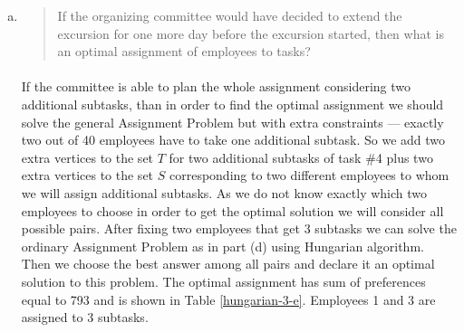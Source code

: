 \begin{enumerate}[(a)]
\item\begin{quote}If the organizing committee would have decided to extend the excursion for one
more day before the excursion started, then what is an optimal assignment of
employees to tasks?\end{quote}

	\paragraph{}
	If the committee is able to plan the whole assignment considering two additional subtasks, than in order to find the optimal assignment we should solve the general Assignment Problem but with extra constraints --- exactly two out of 40 employees have to take one additional subtask. So we add two extra vertices to the set $T$ for two additional subtasks of task \#4 plus two extra vertices to the set $S$ corresponding to two different employees to whom we will assign additional subtasks. As we do not know exactly which two employees to choose in order to get the optimal solution we will consider all possible pairs. After fixing two employees that get 3 subtasks we can solve the ordinary Assignment Problem as in part (d) using Hungarian algorithm. Then we choose the best answer among all pairs and declare it an optimal solution to this problem. The optimal assignment has sum of preferences equal to 793 and is shown in Table \ref{hungarian-3-e}. Employees 1 and 3 are assigned to 3 subtasks.


\end{enumerate}
